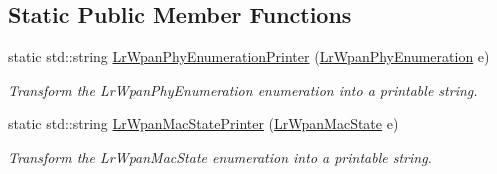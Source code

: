 \subsection*{Static Public Member Functions}
\begin{DoxyCompactItemize}
\item 
static std\+::string \hyperlink{classns3_1_1LrWpanHelper_a261495b92601e3d22d79805481b3b208}{Lr\+Wpan\+Phy\+Enumeration\+Printer} (\hyperlink{group__lr-wpan_ga6494269d13d45c511a07b7ccbb1de754}{Lr\+Wpan\+Phy\+Enumeration} e)
\begin{DoxyCompactList}\small\item\em Transform the Lr\+Wpan\+Phy\+Enumeration enumeration into a printable string. \end{DoxyCompactList}\item 
static std\+::string \hyperlink{classns3_1_1LrWpanHelper_abab2f2406d0c47ff1276051e0f4fec0a}{Lr\+Wpan\+Mac\+State\+Printer} (\hyperlink{group__lr-wpan_ga02ee7efd682937a8781f5e6101f61884}{Lr\+Wpan\+Mac\+State} e)
\begin{DoxyCompactList}\small\item\em Transform the Lr\+Wpan\+Mac\+State enumeration into a printable string. \end{DoxyCompactList}\end{DoxyCompactItemize}
